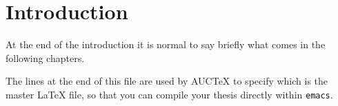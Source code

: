 \chapter{Introduction}
\label{sec:intro}


At the end of the introduction it is normal to say briefly what comes
in the following chapters.

The lines at the end of this file are used by AUCTeX to specify which
is the master \LaTeX{} file, so that you can compile your thesis
directly within \texttt{emacs}.

